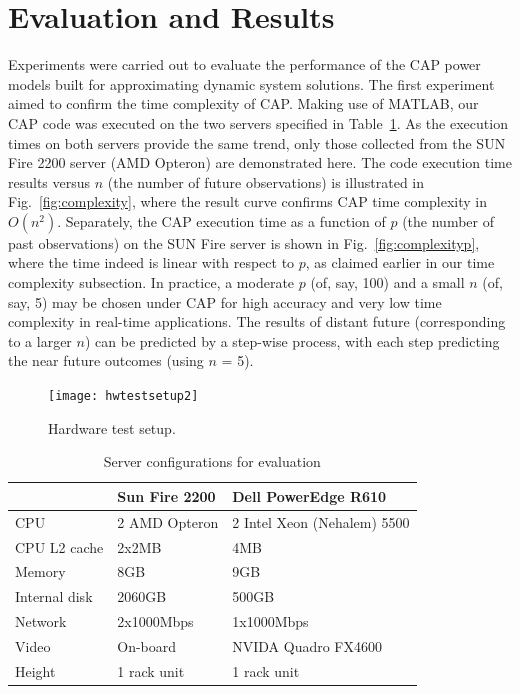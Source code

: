 \documentclass[acmtaco]{acmtrans2m}
\newcommand{\figurename}{Fig.}
\begin{document}
\section{Evaluation and Results}
\label{sec:evaluation}
Experiments were carried out to evaluate the performance of the CAP
power models built for approximating dynamic system solutions.  The
first experiment aimed to confirm the time complexity of CAP.  Making
use of MATLAB, our CAP code was executed on the two servers specified in
Table~\ref{tab:hardware}.  As the execution times on both servers
provide the same trend, only those collected from the SUN Fire 2200
server (AMD Opteron) are demonstrated here.  The code execution time
results versus $n$ (the number of future observations) is illustrated in
\figurename~\ref{fig:complexity}, where the result curve confirms CAP
time complexity in $O(n^{2})$.  Separately, the CAP execution time as a
function of $p$ (the number of past observations) on the SUN Fire server
is shown in \figurename~\ref{fig:complexityp}, where the time indeed is
linear with respect to $p$, as claimed earlier in our time complexity
subsection.  In practice, a moderate $p$ (of, say, 100) and a small $n$
(of, say, 5) may be chosen under CAP for high accuracy and very low time
complexity in real-time applications.  The results of distant future
(corresponding to a larger $n$) can be predicted by a step-wise process,
with each step predicting the near future outcomes (using $n$ = 5).
\begin{figure}[tp]
  \centering
  \texttt{[image: hwtestsetup2]}
  \caption{Hardware test setup.}
  \label{fig:hardware}
\end{figure}
\begin{table}[tbhp]
  \centering
  \caption{Server configurations for evaluation}
  \label{tab:hardware}
  \begin{tabular}{l l l}
   \hline
    &\textbf{Sun Fire 2200}&\textbf{Dell PowerEdge R610}\\  
    \hline
    CPU&2 AMD Opteron&2 Intel Xeon (Nehalem) 5500\\
    CPU L2 cache&2x2MB&4MB\\
    Memory&8GB&9GB\\
    Internal disk&2060GB&500GB\\
    Network&2x1000Mbps&1x1000Mbps\\
    Video&On-board&NVIDA Quadro FX4600\\
    Height&1 rack unit&1 rack unit\\
    \hline
  \end{tabular}
\end{table}
\end{document}
